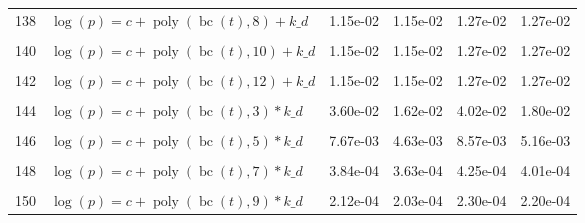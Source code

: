 \documentclass[12pt,a4paper]{article}
\DeclareMathOperator{\bc}{bc}
\DeclareMathOperator{\poly}{poly}
\begin{document}
\begin{longtable}[t]{ll>{\raggedleft\arraybackslash}p{2cm}>{\raggedleft\arraybackslash}p{2cm}>{\raggedleft\arraybackslash}p{2cm}>{\raggedleft\arraybackslash}p{2cm}}
138 & $\log(p) = c + \poly\left( \bc(t), 8 \right) + k\_d$ & 1.15e-02 & 1.15e-02 & 1.27e-02 & 1.27e-02\\
\cellcolor{gray!6}{139} & \cellcolor{gray!6}{$\log(p) = c + \poly\left( \bc(t), 9 \right) + k\_d$} & \cellcolor{gray!6}{1.15e-02} & \cellcolor{gray!6}{1.15e-02} & \cellcolor{gray!6}{1.27e-02} & \cellcolor{gray!6}{1.27e-02}\\
140 & $\log(p) = c + \poly\left( \bc(t), 10 \right) + k\_d$ & 1.15e-02 & 1.15e-02 & 1.27e-02 & 1.27e-02\\
\cellcolor{gray!6}{141} & \cellcolor{gray!6}{$\log(p) = c + \poly\left( \bc(t), 11 \right) + k\_d$} & \cellcolor{gray!6}{1.15e-02} & \cellcolor{gray!6}{1.15e-02} & \cellcolor{gray!6}{1.27e-02} & \cellcolor{gray!6}{1.27e-02}\\
142 & $\log(p) = c + \poly\left( \bc(t), 12 \right) + k\_d$ & 1.15e-02 & 1.15e-02 & 1.27e-02 & 1.27e-02\\
\cellcolor{gray!6}{143} & \cellcolor{gray!6}{$\log(p) = c + \poly\left( \bc(t), 13 \right) + k\_d$} & \cellcolor{gray!6}{1.15e-02} & \cellcolor{gray!6}{1.15e-02} & \cellcolor{gray!6}{1.27e-02} & \cellcolor{gray!6}{1.27e-02}\\
144 & $\log(p) = c + \poly\left( \bc(t), 3 \right) * k\_d$ & 3.60e-02 & 1.62e-02 & 4.02e-02 & 1.80e-02\\
\cellcolor{gray!6}{145} & \cellcolor{gray!6}{$\log(p) = c + \poly\left( \bc(t), 4 \right) * k\_d$} & \cellcolor{gray!6}{1.84e-02} & \cellcolor{gray!6}{1.83e-02} & \cellcolor{gray!6}{2.06e-02} & \cellcolor{gray!6}{2.04e-02}\\
146 & $\log(p) = c + \poly\left( \bc(t), 5 \right) * k\_d$ & 7.67e-03 & 4.63e-03 & 8.57e-03 & 5.16e-03\\
\cellcolor{gray!6}{147} & \cellcolor{gray!6}{$\log(p) = c + \poly\left( \bc(t), 6 \right) * k\_d$} & \cellcolor{gray!6}{7.27e-04} & \cellcolor{gray!6}{6.81e-04} & \cellcolor{gray!6}{8.09e-04} & \cellcolor{gray!6}{7.58e-04}\\
148 & $\log(p) = c + \poly\left( \bc(t), 7 \right) * k\_d$ & 3.84e-04 & 3.63e-04 & 4.25e-04 & 4.01e-04\\
\cellcolor{gray!6}{149} & \cellcolor{gray!6}{$\log(p) = c + \poly\left( \bc(t), 8 \right) * k\_d$} & \cellcolor{gray!6}{2.93e-04} & \cellcolor{gray!6}{2.73e-04} & \cellcolor{gray!6}{3.22e-04} & \cellcolor{gray!6}{2.99e-04}\\
150 & $\log(p) = c + \poly\left( \bc(t), 9 \right) * k\_d$ & 2.12e-04 & 2.03e-04 & 2.30e-04 & 2.20e-04\\

\end{longtable}
\end{document}

